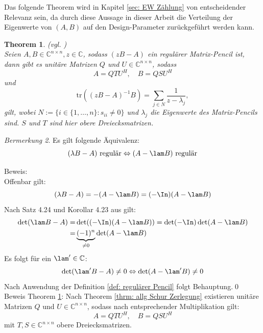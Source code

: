 \documentclass[a4paper,12pt]{report}
\newcommand{\C}{\mathbb C}
\newcommand{\tr}{\text{tr}}
\newcommand{\Cnn}{\C^{n\times n}}
\newcommand{\inv}{^{-1}}
\newcommand{\1}{\mathds{1}}
\theoremstyle{plain} %
\newtheorem{theorem}{Theorem}
\theoremstyle{definition} %
\theoremstyle{remark}
\newtheorem{remark}[theorem]{Bermerkung}
\begin{document}
            Das folgende Theorem wird in Kapitel \ref{sec: EW Zählung} von entscheidender Relevanz sein,
            da durch diese Aussage in dieser Arbeit die Verteilung der Eigenwerte von $(A, B)$ auf den Design-Parameter \s zurückgeführt werden kann.
            \begin{theorem}(vgl. \cite[S. 127]{grundlageFutamura})
                  \label{thrm: IdentitätFutamura}\\
                  Seien $A, B\in\Cnn, z\in \C$, sodass $(zB-A)$ ein regulärer Matrix-Pencil ist, dann gibt es unitäre Matrizen $Q$ und $U \in\Cnn$, sodass
                  $$A = QTU^H,\quad B=QSU^H$$
                  und
                  \begin{equation}
                        \label{eqn: Resultat_Futamura}
                        \tr((zB-A)\inv B) = \sum_{j\in N}\frac{1}{z-\lambda_j},
                  \end{equation}
                  gilt, wobei $N:=\{i\in\{1,\dots,n\}: s_{ii}\ne 0\}$ und $\lambda_j$ die Eigenwerte des Matrix-Pencils sind.
                  $S$ und $T$ sind hier obere Dreiecksmatrizen.
            \end{theorem}

            \begin{remark}
                  \label{Bem: matrixPencilRegulärWennNegativRegulär}
                  Es gilt folgende Äquivalenz:
                  $$(\lambda B-A)\text{ regulär} \Leftrightarrow (A-\lam B)\text{ regulär}$$ 
            \end{remark}
            Beweis:\\
            Offenbar gilt:
            $$(\lambda B-A) = -(A-\lam B) = (-\In) (A-\lam B)$$
            Nach Satz 4.24 und Korollar 4.23 aus \cite[S. 80]{LinAlgWerner} gilt:
            \begin{align*}
                  \det(\lam B-A) =& \det((-\In) (A-\lam B)) = \det(-\In)\det(A-\lam B)\\
                   =& \underbrace{(-1)^n}_{\ne 0} \det(A-\lam B)
            \end{align*}
            Es folgt für ein $\lam'\in\C$:
            $$\det(\lam' B-A)\ne 0 \Leftrightarrow \det(A-\lam'B)\ne 0$$
            Nach Anwendung der Definition \ref{def: regulärer Pencil} folgt Behauptung.\qed\\

            Beweis Theorem \ref{thrm: IdentitätFutamura}:
            Nach Theorem \ref{thrm: allg Schur Zerlegung} existieren unitäre Matrizen $Q$ und $U\in\Cnn$, sodass nach entsprechender Multiplikation gilt:
            $$A=QTU^H,\quad B=QSU^H$$
            mit $T,S\in\Cnn$ obere Dreiecksmatrizen.
            
\end{document}
